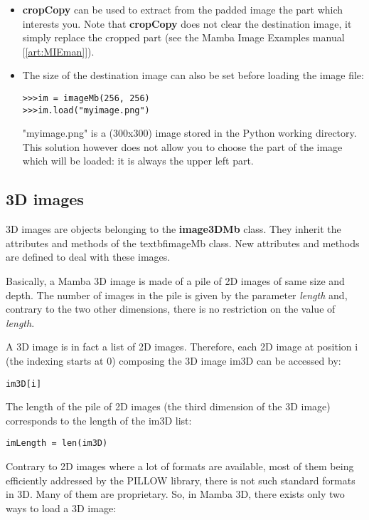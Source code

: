 \documentclass[a4paper,10pt,oneside]{article}
\begin{document}
\begin{itemize}
\item \textbf{cropCopy} can be used to extract from the padded image the part which interests you. Note that
\textbf{cropCopy} does not clear the destination image, it simply replace the cropped part (see the Mamba Image Examples manual [\ref{art:MIEman}]).
\item The size of the destination image can also be set before loading the image file:

\lstset{language=Python}
\begin{lstlisting}
>>>im = imageMb(256, 256)
>>>im.load("myimage.png")
\end{lstlisting}

"myimage.png" is a (300x300) image stored in the Python working directory. This solution however does not allow you
to choose the part of the image which will be loaded: it is always the upper left part.
\end{itemize}

\subsection{3D images}
3D images are objects belonging to the \textbf{image3DMb} class. They inherit the attributes and methods of the
textbf{imageMb} class. New attributes and methods are defined to deal with these images.

Basically, a Mamba 3D image is made of a pile of 2D images of same size and depth. The number of images in
the pile is given by the parameter \textit{length} and, contrary to the two other dimensions, there is no restriction
on the value of \textit{length}.

A 3D image is in fact a list of 2D images. Therefore, each 2D image at position i (the indexing starts at 0) composing the 3D image im3D can
be accessed by:

\lstset{language=Python}
\begin{lstlisting}
im3D[i]
\end{lstlisting}

The length of the pile of 2D images (the third dimension of the 3D image) corresponds to the length of the im3D
list:

\lstset{language=Python}
\begin{lstlisting}
imLength = len(im3D)
\end{lstlisting}

Contrary to 2D images where a lot of formats are available, most of them being efficiently addressed by the
PILLOW library, there is not such standard formats in 3D. Many of them are proprietary. So, in Mamba 3D, there
exists only two ways to load a 3D image:
\end{document}
